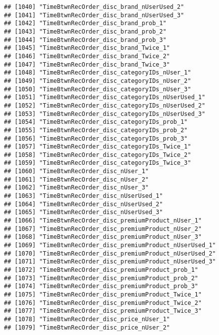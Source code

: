 \documentclass[10pt]{report}
\begin{document}
\begin{verbatim}
## [1040] "TimeBtwnRecOrder_disc_brand_nUserUsed_2"              
## [1041] "TimeBtwnRecOrder_disc_brand_nUserUsed_3"              
## [1042] "TimeBtwnRecOrder_disc_brand_prob_1"                   
## [1043] "TimeBtwnRecOrder_disc_brand_prob_2"                   
## [1044] "TimeBtwnRecOrder_disc_brand_prob_3"                   
## [1045] "TimeBtwnRecOrder_disc_brand_Twice_1"                  
## [1046] "TimeBtwnRecOrder_disc_brand_Twice_2"                  
## [1047] "TimeBtwnRecOrder_disc_brand_Twice_3"                  
## [1048] "TimeBtwnRecOrder_disc_categoryIDs_nUser_1"            
## [1049] "TimeBtwnRecOrder_disc_categoryIDs_nUser_2"            
## [1050] "TimeBtwnRecOrder_disc_categoryIDs_nUser_3"            
## [1051] "TimeBtwnRecOrder_disc_categoryIDs_nUserUsed_1"        
## [1052] "TimeBtwnRecOrder_disc_categoryIDs_nUserUsed_2"        
## [1053] "TimeBtwnRecOrder_disc_categoryIDs_nUserUsed_3"        
## [1054] "TimeBtwnRecOrder_disc_categoryIDs_prob_1"             
## [1055] "TimeBtwnRecOrder_disc_categoryIDs_prob_2"             
## [1056] "TimeBtwnRecOrder_disc_categoryIDs_prob_3"             
## [1057] "TimeBtwnRecOrder_disc_categoryIDs_Twice_1"            
## [1058] "TimeBtwnRecOrder_disc_categoryIDs_Twice_2"            
## [1059] "TimeBtwnRecOrder_disc_categoryIDs_Twice_3"            
## [1060] "TimeBtwnRecOrder_disc_nUser_1"                        
## [1061] "TimeBtwnRecOrder_disc_nUser_2"                        
## [1062] "TimeBtwnRecOrder_disc_nUser_3"                        
## [1063] "TimeBtwnRecOrder_disc_nUserUsed_1"                    
## [1064] "TimeBtwnRecOrder_disc_nUserUsed_2"                    
## [1065] "TimeBtwnRecOrder_disc_nUserUsed_3"                    
## [1066] "TimeBtwnRecOrder_disc_premiumProduct_nUser_1"         
## [1067] "TimeBtwnRecOrder_disc_premiumProduct_nUser_2"         
## [1068] "TimeBtwnRecOrder_disc_premiumProduct_nUser_3"         
## [1069] "TimeBtwnRecOrder_disc_premiumProduct_nUserUsed_1"     
## [1070] "TimeBtwnRecOrder_disc_premiumProduct_nUserUsed_2"     
## [1071] "TimeBtwnRecOrder_disc_premiumProduct_nUserUsed_3"     
## [1072] "TimeBtwnRecOrder_disc_premiumProduct_prob_1"          
## [1073] "TimeBtwnRecOrder_disc_premiumProduct_prob_2"          
## [1074] "TimeBtwnRecOrder_disc_premiumProduct_prob_3"          
## [1075] "TimeBtwnRecOrder_disc_premiumProduct_Twice_1"         
## [1076] "TimeBtwnRecOrder_disc_premiumProduct_Twice_2"         
## [1077] "TimeBtwnRecOrder_disc_premiumProduct_Twice_3"         
## [1078] "TimeBtwnRecOrder_disc_price_nUser_1"                  
## [1079] "TimeBtwnRecOrder_disc_price_nUser_2"                  

\end{verbatim}
\end{document}
